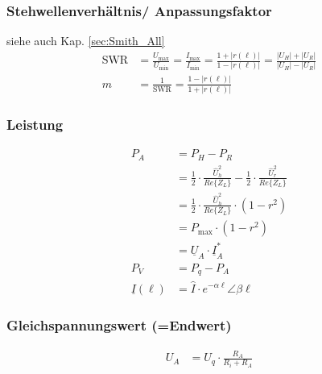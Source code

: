 \subsubsection{Stehwellenverhältnis/ Anpassungsfaktor}
siehe auch Kap. \ref{sec:Smith_All}
\begin{align*}
    \mathrm{SWR}      & = \frac{U_\text{max}}{U_\text{min}} = \frac{I_\text{max}}{I_\text{min}} = \frac{1+|r(\ell)|}{1-|r(\ell)|} = \frac{|U_H|+|U_R|}{|U_H|-|U_R|} \\
    m                 & = \frac{1}{\mathrm{SWR}} = \frac{1 - |r(\ell)|}{1 + |r(\ell)|}
\end{align*}

\subsubsection{Leistung}
\begin{align*}
    P_{A}            & = P_{H}-P_{R}                                                                                                 \\
                     & = \frac{1}{2} \cdot \frac{\hat{U}_{h}^{2}}{Re\{Z_{L}\}}-\frac{1}{2} \cdot \frac{\hat{U}_{r}^{2}}{Re\{Z_{L}\}} \\
                     & =\frac{1}{2} \cdot \frac{\hat{U}_{h}^{2}}{Re\{Z_{L}\}} \cdot\left(1-r^{2}\right)                              \\
                     & = P_{\max} \cdot\left(1-r^{2}\right)                                                                          \\
                     & = \underline{U}_A\cdot\underline{I}_A^*                                                                       \\
    P_V              & = P_q -P_A                                                                                                    \\
    \underline{I}(\ell) & = \hat{I}\cdot e^{-\alpha \ell}\angle \beta \ell
\end{align*}
\subsubsection{Gleichspannungswert (=Endwert)}
\begin{align*}
    U_A & = U_q\cdot\frac{R_A}{R_i+R_A}
\end{align*}

